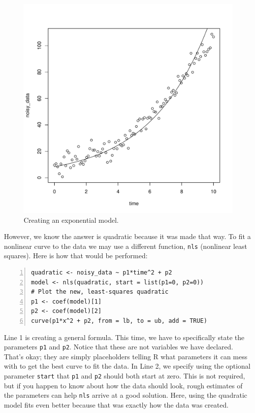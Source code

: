 \documentclass[12pt]{article}
\theoremstyle{remark}
\begin{document}
\begin{figure}[htbp]
\centering
\includegraphics[scale=0.5]{expmodel.pdf}
\caption{Creating an exponential model.}
\label{expmodel}
\end{figure}

However, we know the answer is quadratic because it was made that way. To fit a nonlinear curve to the data we may use a different function, \verb|nls| (nonlinear least squares). Here is how that would be performed:
\begin{Verbatim}[frame=single, fontsize=\small, numbers=left]
quadratic <- noisy_data ~ p1*time^2 + p2
model <- nls(quadratic, start = list(p1=0, p2=0))
# Plot the new, least-squares quadratic
p1 <- coef(model)[1]
p2 <- coef(model)[2]
curve(p1*x^2 + p2, from = lb, to = ub, add = TRUE)
\end{Verbatim}

Line 1 is creating a general formula. This time, we have to specifically state the parameters \verb|p1| and \verb|p2|. Notice that these are not variables we have declared. That's okay; they are simply placeholders telling R what parameters it can mess with to get the best curve to fit the data. In Line 2, we specify using the optional parameter \verb|start| that \verb|p1| and \verb|p2| should both start at zero. This is not required, but if you happen to know about how the data should look, rough estimates of the parameters can help \verb|nls| arrive at a good solution. Here, using the quadratic model fits even better because that was exactly how the data was created.
\end{document}
